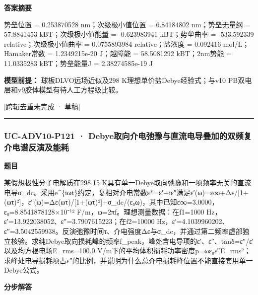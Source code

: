 \documentclass[UTF8,11pt,a4paper]{ctexart}
\begin{document}
\noindent\textbf{答案摘要}\par
势垒位置 = 0.253870528 nm；次级极小值位置 = 6.84184802 nm；势垒无量纲 = 57.8841453 kBT；次级极小值能量 = -0.623983941 kBT；势垒曲率 = -533.592339 relative；次级极小值曲率 = 0.0755893984 relative；盐浓度 = 0.092416 mol/L；Hamaker常数 = 1.2349215e-20 J；越障能 = 58.5081292 kBT；2nm势能 = 11.0335283 kBT；势垒能量J = 2.38274585e-19 J\par
\noindent\textbf{模型前提：}
球板DLVO远场近似及298 K理想单价盐Debye经验式；与v10 PB双电层和v9胶体模型有待人工方程级比较。\par
\noindent\textcolor{red!65!black}{[跨辑去重未完成 · 草稿]} \par
\medskip\hrule\medskip
{}
\subsubsection*{UC-ADV10-P121 · Debye取向介电弛豫与直流电导叠加的双频复介电谱反演及能耗}
\noindent\textbf{题目}\par
某假想极性分子电解质在298.15 K具有单一Debye取向弛豫和一项频率无关的直流电导σ\_dc。采用e\textasciicircum{}\{iωt\}约定，复相对介电常数ε*=ε′−iε″满足ε′(ω)=ε∞+Δε/[1+(ωτ)²]，ε″(ω)=Δε(ωτ)/[1+(ωτ)²]+σ\_dc/(ε₀ω)，其中已知ε∞=3.0000，ε₀=8.8541878128×10⁻¹² F/m，ω=2πf。理想测量数据：在f1=1000 Hz，ε′=13.922038052、ε″=3.7907615223；在f2=10000 Hz，ε′=4.1039960202、ε″=3.5042559938。反演弛豫时间τ、介电强度Δε与σ\_dc，并通过第二频率虚部独立核验。求纯Debye取向损耗峰的频率f\_peak，峰处含电导项的ε′、ε″、tanδ=ε″/ε′以及均方根电场E\_rms=100.0 V/m下的平均体积损耗功率密度p=ωε₀ε″E\_rms²；求峰处电导损耗项占ε″的比例，并说明为什么总介电损耗峰位置不能直接套用单一Debye公式。\par
\medskip\noindent\textbf{分步解答}
\end{document}
